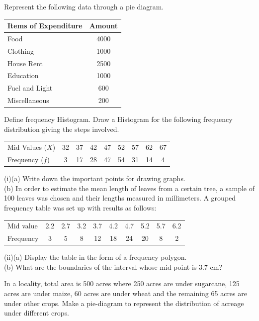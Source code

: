 \documentclass[11pt,a4paper]{article}
\begin{document}
\begin{longlist}
\item Represent the following data through a pie diagram.
\begin{center}
\begin{tabular}{lc}
Items of Expenditure & Amount \\
\hline
Food & 4000 \\
Clothing & 1000 \\
House Rent & 2500 \\
Education & 1000 \\
Fuel and Light & 600 \\
Miscellaneous & 200
\end{tabular}
\end{center}

\item Define frequency Histogram. Draw a Histogram for the following frequency distribution giving the steps involved.
\begin{center}
\begin{tabular}{l|cccccccc}
Mid Values ($X$) & 32 & 37 & 42 & 47 & 52 & 57 & 62 & 67 \\
Frequency ($f$) & 3 & 17 & 28 & 47 & 54 & 31 & 14 & 4
\end{tabular}
\end{center}

\item [10.] (i)(a) Write down the important points for drawing graphs.\\
(b) In order to estimate the mean length of leaves from a certain tree, a sample of 100 leaves was chosen and their lengths measured in millimeters. A grouped frequency table was set up with results as follows:
\begin{center}
\begin{tabular}{l|ccccccccc}
Mid value & 2.2 & 2.7 & 3.2 & 3.7 & 4.2 & 4.7 & 5.2 & 5.7 & 6.2 \\
Frequency & 3 & 5 & 8 & 12 & 18 & 24 & 20 & 8 & 2
\end{tabular}
\end{center}
(ii)(a) Display the table in the form of a frequency polygon.\\
(b) What are the boundaries of the interval whose mid-point is 3.7 cm?

\item In a locality, total area is 500 acres where 250 acres are under sugarcane, 125 acres are under maize, 60 acres are under wheat and the remaining 65 acres are under other crops. Make a pie-diagram to represent the distribution of acreage under different crops.


\end{longlist}
\end{document}
